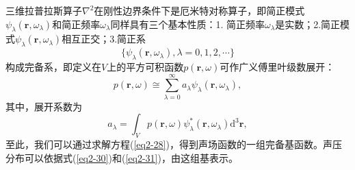 三维拉普拉斯算子$\nabla^{2}$在刚性边界条件下是厄米特对称算子，即简正模式$\psi_{\lambda}(\mathbf{r},\omega_{\lambda})$和简正频率$\omega_{\lambda}$同样具有三个基本性质：1. 简正频率$\omega_{\lambda}$是实数；2.简正模式$\psi_{\lambda}(\mathbf{r},\omega_{\lambda})$相互正交；3.简正系
\begin{equation}\label{eq2-29}
  \{\psi_{\lambda}(\mathbf{r},\omega_{\lambda}),\lambda = 0,1,2,\cdots\}
\end{equation}
构成完备系，即定义在$V$上的平方可积函数$p(\mathbf{r},\omega)$可作广义傅里叶级数展开：
\begin{equation}\label{eq2-30}
  p(\mathbf{r},\omega)\cong\sum_{\lambda = 0}^{\infty}a_{\lambda}\psi_{\lambda}(\mathbf{r},\omega_{\lambda}),
\end{equation}
其中，展开系数为
\begin{equation}\label{eq2-31}
  a_{\lambda}=\int_{V}p(\mathbf{r},\omega)\psi_{\lambda}^{*}(\mathbf{r},\omega_{\lambda})\mathrm{d}^{3}\mathbf{r},
\end{equation}
至此，我们可以通过求解方程(\ref{eq2-28})，得到声场函数的一组完备基函数。声压分布可以依据式(\ref{eq2-30})和(\ref{eq2-31})，由这组基表示。

